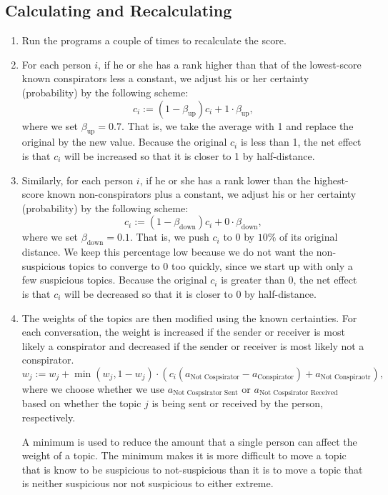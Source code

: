 \documentclass{icmmcm}
\begin{document}
\subsection{Calculating and Recalculating}
\begin{enumerate}

\item Run the programs a couple of times to recalculate
the score.

\item For each person $i$,
if he or she has a 
rank higher than that of the lowest-score known conspirators less a constant,
we adjust his or her certainty (probability) by the following scheme:
\begin{equation}
c_i := (1-\beta_{\text{up}})c_i + 1\cdot \beta_{\text{up}},
\label{push_up}
\end{equation}
where we set $\beta_{\text{up}} = 0.7.$
That is, we take the average with 1 and replace the original by the new value. 
Because the original $c_i$ is less than 1, the net effect is that
$c_i$ will be increased so that it is closer to 1 by half-distance.

\item Similarly,
for each person $i$,
if he or she has a 
rank lower than the highest-score known non-conspirators plus a constant,
we adjust his or her certainty (probability) by the following scheme:
\begin{equation}
c_i := (1 - \beta_{\text{down}})c_i + 0\cdot \beta_{\text{down}},
\label{push_down}
\end{equation}
where we set $\beta_{\text{down}} = 0.1.$
That is, we push $c_i$ to 0 by $10\%$ of its original distance.
We keep this percentage low because we do not want
the non-suspicious topics to converge to 0 too quickly, since
we start up with only a few suspicious topics.
Because the original $c_i$ is greater than 0, the net effect is that
$c_i$ will be decreased so that it is closer to 0 by half-distance.

\item The weights of the topics are then modified using the known certainties.  For each conversation, the weight is increased if the sender or receiver is most likely a conspirator and decreased if the sender or receiver is most likely not a conspirator. \[w_j := w_j + \min(w_j,1-w_j) \cdot (c_i(a_{\text{Not Cospsirator}}-a_{\text{Conspirator}})+a_{\text{Not Conspiraotr}}),\] 
where we choose whether we use $a_{\text{Not Cospsirator Sent}}$
or $a_{\text{Not Cospsirator Received}}$ based on whether
the topic $j$ is being sent or received by the person,
respectively.

A minimum is used to reduce the amount that a single person can affect the weight of a topic. The minimum makes it is more difficult to move a topic that is know to be suspicious to not-suspicious than it is to move a topic that is neither suspicious nor not suspicious  to either extreme. 
\end{enumerate}
\end{document}
